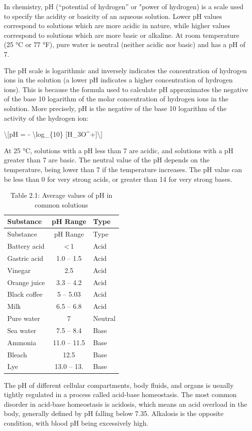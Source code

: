 \documentclass[
]{article}
\theoremstyle{definition}
\theoremstyle{definition}
\theoremstyle{definition}
\theoremstyle{remark}
\begin{document}
In chemistry, pH (``potential of hydrogen'' or "power of hydrogen) is a
scale used to specify the acidity or basicity of an aqueous solution.
Lower pH values correspond to solutions which are more acidic in nature,
while higher values correspond to solutions which are more basic or
alkaline. At room temperature (25 °C or 77 °F), pure water is neutral
(neither acidic nor basic) and has a pH of 7.

The pH scale is logarithmic and inversely indicates the concentration of
hydrogen ions in the solution (a lower pH indicates a higher
concentration of hydrogen ions). This is because the formula used to
calculate pH approximates the negative of the base 10 logarithm of the
molar concentration of hydrogen ions in the solution. More precisely, pH
is the negative of the base 10 logarithm of the activity of the hydrogen
ion:

{\textbackslash{[}pH = - \textbackslash log\_\{10\}
{[}H\_3O\^{}+{]}\textbackslash{]}}

At 25 °C, solutions with a pH less than 7 are acidic, and solutions with
a pH greater than 7 are basic. The neutral value of the pH depends on
the temperature, being lower than 7 if the temperature increases. The pH
value can be less than 0 for very strong acids, or greater than 14 for
very strong bases.

\begin{longtable}[]{@{}lcl@{}}
\caption{ \protect\hypertarget{tab:solutions}{}{Table 2.1: }Average
values of pH in common solutions }\tabularnewline
\toprule
Substance & pH Range & Type\tabularnewline
\midrule
\endfirsthead
\toprule
Substance & pH Range & Type\tabularnewline
\midrule
\endhead
Battery acid & \textless\,1 & Acid\tabularnewline
Gastric acid & 1.0 -- 1.5 & Acid\tabularnewline
Vinegar & 2.5 & Acid\tabularnewline
Orange juice & 3.3 -- 4.2 & Acid\tabularnewline
Black coffee & 5 -- 5.03 & Acid\tabularnewline
Milk & 6.5 -- 6.8 & Acid\tabularnewline
Pure water & 7 & Neutral\tabularnewline
Sea water & 7.5 -- 8.4 & Base\tabularnewline
Ammonia & 11.0 -- 11.5 & Base\tabularnewline
Bleach & 12.5 & Base\tabularnewline
Lye & 13.0 -- 13. & Base\tabularnewline
\bottomrule
\end{longtable}

The pH of different cellular compartments, body fluids, and organs is
usually tightly regulated in a process called acid-base homeostasis. The
most common disorder in acid-base homeostasis is acidosis, which means
an acid overload in the body, generally defined by pH falling below
7.35. Alkalosis is the opposite condition, with blood pH being
excessively high.
\end{document}
